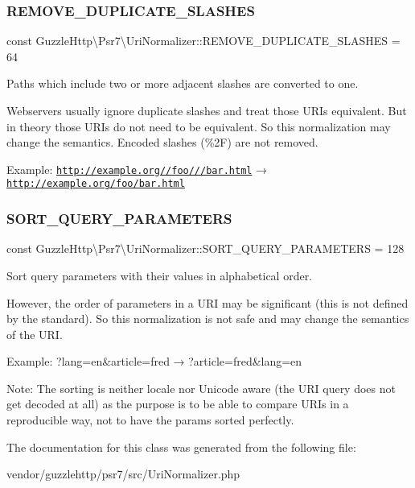 \subsubsection{\texorpdfstring{R\+E\+M\+O\+V\+E\+\_\+\+D\+U\+P\+L\+I\+C\+A\+T\+E\+\_\+\+S\+L\+A\+S\+H\+ES}{REMOVE\_DUPLICATE\_SLASHES}}
{\footnotesize\ttfamily const Guzzle\+Http\textbackslash{}\+Psr7\textbackslash{}\+Uri\+Normalizer\+::\+R\+E\+M\+O\+V\+E\+\_\+\+D\+U\+P\+L\+I\+C\+A\+T\+E\+\_\+\+S\+L\+A\+S\+H\+ES = 64}

Paths which include two or more adjacent slashes are converted to one.

Webservers usually ignore duplicate slashes and treat those U\+R\+Is equivalent. But in theory those U\+R\+Is do not need to be equivalent. So this normalization may change the semantics. Encoded slashes (\%2F) are not removed.

Example\+: \href{http://example.org//foo///bar.html}{\tt http\+://example.\+org//foo///bar.\+html} → \href{http://example.org/foo/bar.html}{\tt http\+://example.\+org/foo/bar.\+html} \mbox{\label{classGuzzleHttp_1_1Psr7_1_1UriNormalizer_ac255a421712175a81072304b221428bf}} 
\subsubsection{\texorpdfstring{S\+O\+R\+T\+\_\+\+Q\+U\+E\+R\+Y\+\_\+\+P\+A\+R\+A\+M\+E\+T\+E\+RS}{SORT\_QUERY\_PARAMETERS}}
{\footnotesize\ttfamily const Guzzle\+Http\textbackslash{}\+Psr7\textbackslash{}\+Uri\+Normalizer\+::\+S\+O\+R\+T\+\_\+\+Q\+U\+E\+R\+Y\+\_\+\+P\+A\+R\+A\+M\+E\+T\+E\+RS = 128}

Sort query parameters with their values in alphabetical order.

However, the order of parameters in a U\+RI may be significant (this is not defined by the standard). So this normalization is not safe and may change the semantics of the U\+RI.

Example\+: ?lang=en\&article=fred → ?article=fred\&lang=en

Note\+: The sorting is neither locale nor Unicode aware (the U\+RI query does not get decoded at all) as the purpose is to be able to compare U\+R\+Is in a reproducible way, not to have the params sorted perfectly. 

The documentation for this class was generated from the following file\+:\begin{DoxyCompactItemize}
\item 
vendor/guzzlehttp/psr7/src/Uri\+Normalizer.\+php\end{DoxyCompactItemize}
